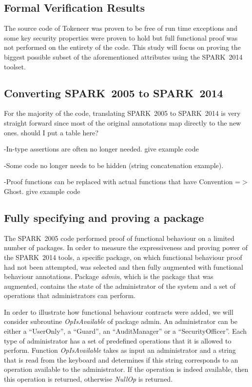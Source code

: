 \documentclass[10pt,a4paper,twocolumn]{article}
\newcommand{\oldspark}{SPARK~2005\xspace}
\newcommand{\newspark}{SPARK~2014\xspace}
\begin{document}
\subsection{Formal Verification Results}

The source code of Tokeneer was proven to be free of run time
exceptions and some key security properties were proven to hold but
full functional proof was not performed on the entirety of the
code. This study will focus on proving the biggest possible subset of
the aforementioned attributes using the \newspark toolset.

\subsection{Converting \oldspark to \newspark}

For the majority of the code, translating \oldspark to \newspark is
very straight forward since most of the original annotations map
directly to the new ones. {should I put a table here?}

-In-type assertions are often no longer needed. {give example code}

-Some code no longer needs to be hidden (string concatenation example).

-Proof functions can be replaced with actual functions that have
Convention =$>$ Ghost. {give example code}

\subsection{Fully specifying and proving a package}

The \oldspark code performed proof of functional behaviour on a
limited number of packages. In order to measure the expressiveness and
proving power of the \newspark tools, a specific package, on which
functional behaviour proof had not been attempted, was selected and
then fully augmented with functional behaviour annotations. Package
\emph{admin}, which is the package that was augmented, contains the
state of the administrator of the system and a set of operations that
administrators can perform.

In order to illustrate how functional behaviour contracts were added,
we will consider subroutine \emph{OpIsAvailable} of package admin. An
administrator can be either a ``UserOnly'', a ``Guard'', an
``AuditManager'' or a ``SecurityOfficer''. Each type of administrator
has a set of predefined operations that it is allowed to
perform. Function \emph{OpIsAvailable} takes as input an administrator
and a string that is read from the keyboard and determines if this
string corresponds to an operation available to the administrator. If
the operation is indeed available, then this operation is returned,
otherwise \emph{NullOp} is returned.
\end{document}
